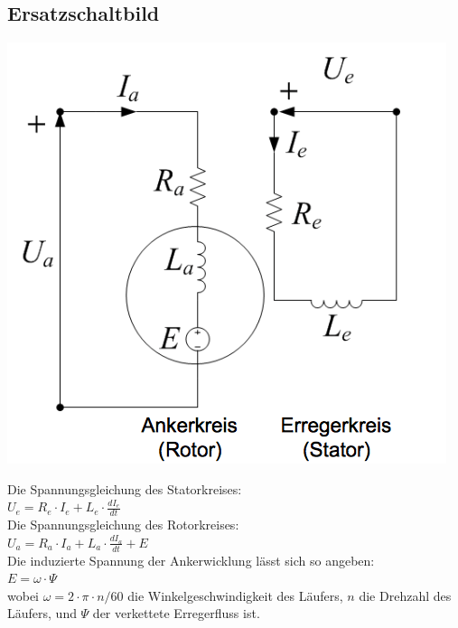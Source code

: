 \subsection{Ersatzschaltbild}
\begin{minipage}{0.4 \linewidth}
\includegraphics[width = \linewidth]{./Pics/VL45/GSMErsatzschaltbild2}
\end{minipage}
\begin{minipage}{0.6\linewidth}
Die Spannungsgleichung des Statorkreises: \\

$U_e = R_e \cdot I_e + L_e \cdot \frac{dI_e}{dt}$ \\

Die Spannungsgleichung des Rotorkreises: \\

$U_a = R_a \cdot I_a + L_a \cdot \frac{dI_a}{dt} + E $\\

Die induzierte Spannung der Ankerwicklung lässt sich so angeben: \\

$E = \omega \cdot \Psi$\\

wobei $\omega = 2 \cdot \pi \cdot n / 60$ die Winkelgeschwindigkeit des Läufers, $n$ die Drehzahl des Läufers, und $\Psi$ der verkettete Erregerfluss ist. 
\end{minipage}

